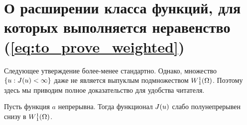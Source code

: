 \section{О расширении класса функций, для которых выполняется неравенство (\ref{eq:to_prove_weighted})}



Следующее утверждение более-менее стандартно.
Однако, множество $\{u: J(u) < \infty\}$ даже не является выпуклым подмножеством $W{}_1^1(\Omega)$.
Поэтому здесь мы приводим полное доказательство для удобства читателя.

\begin{lm}
\label{lm:lowersemi}
Пусть функция $a$ непрерывна.
Тогда функционал $J(u)$ слабо полунепрерывен снизу в $W{}_1^1(\Omega)$.
\end{lm}

